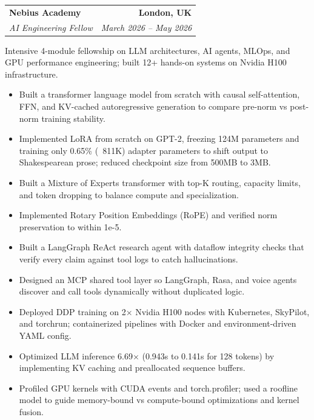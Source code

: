 \documentclass[letterpaper,11pt]{article}
\makeatletter
\newcommand{\resumeItem}[1]{
  \item\small{
    {#1 \vspace{-3pt}}
  }
}
\newcommand{\resumeSubheading}[4]{
  \vspace{-3pt}\item
    \begin{tabular*}{1.0\textwidth}[t]{l@{\extracolsep{\fill}}r}
      \textbf{#1} & \textbf{\small #2} \\
      \textit{\small#3} & \textit{\small #4} \\
    \end{tabular*}\vspace{-4pt}
}
\newcommand{\resumeRoleSummary}[1]{
  {\small #1\par}
  \vspace{-2pt}
}
\newcommand{\resumeItemListStart}{\begin{itemize}}
\newcommand{\resumeItemListEnd}{\end{itemize}\vspace{0pt}}
\makeatother
\begin{document}
    \resumeSubheading
      {Nebius Academy}{London, UK}
      {AI Engineering Fellow}{March 2026 -- May 2026}
    \resumeRoleSummary{Intensive 4-module fellowship on LLM architectures, AI agents, MLOps, and GPU performance engineering; built 12+ hands-on systems on Nvidia H100 infrastructure.}
    \resumeItemListStart
      \resumeItem{Built a transformer language model from scratch with causal self-attention, FFN, and KV-cached autoregressive generation to compare pre-norm vs post-norm training stability.}
      \resumeItem{Implemented LoRA from scratch on GPT-2, freezing 124M parameters and training only 0.65\% (~811K) adapter parameters to shift output to Shakespearean prose; reduced checkpoint size from 500MB to 3MB.}
      \resumeItem{Built a Mixture of Experts transformer with top-K routing, capacity limits, and token dropping to balance compute and specialization.}
      \resumeItem{Implemented Rotary Position Embeddings (RoPE) and verified norm preservation to within 1e-5.}
      \resumeItem{Built a LangGraph ReAct research agent with dataflow integrity checks that verify every claim against tool logs to catch hallucinations.}
      \resumeItem{Designed an MCP shared tool layer so LangGraph, Rasa, and voice agents discover and call tools dynamically without duplicated logic.}
      \resumeItem{Deployed DDP training on 2$\times$ Nvidia H100 nodes with Kubernetes, SkyPilot, and torchrun; containerized pipelines with Docker and environment-driven YAML config.}
      \resumeItem{Optimized LLM inference 6.69$\times$ (0.943s to 0.141s for 128 tokens) by implementing KV caching and preallocated sequence buffers.}
      \resumeItem{Profiled GPU kernels with CUDA events and torch.profiler; used a roofline model to guide memory-bound vs compute-bound optimizations and kernel fusion.}
    \resumeItemListEnd
\end{document}
